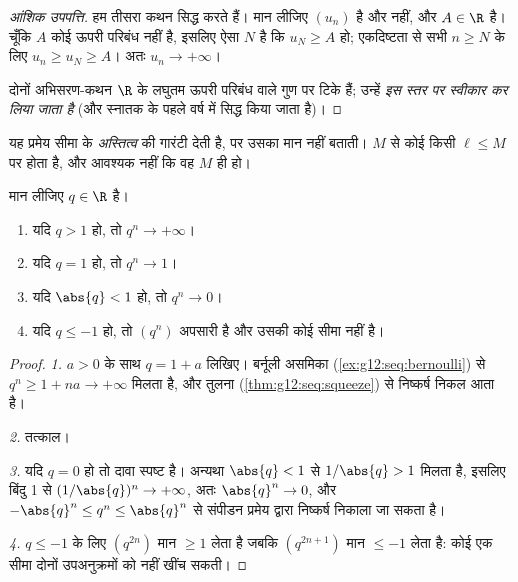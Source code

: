 \begin{proof}[आंशिक उपपत्ति]
हम तीसरा कथन सिद्ध करते हैं। मान लीजिए $(u_n)$  है और  नहीं,
और $A \in \R$ है। चूँकि $A$ कोई ऊपरी परिबंध नहीं है, इसलिए ऐसा $N$ है कि
$u_N \geq A$ हो; एकदिष्टता से सभी $n \geq N$ के लिए $u_n \geq u_N \geq A$। अतः $u_n \to +\infty$।

दोनों अभिसरण-कथन $\R$ के लघुतम ऊपरी परिबंध वाले गुण पर टिके हैं; उन्हें
\emph{इस स्तर पर स्वीकार कर लिया जाता है} (और स्नातक के पहले वर्ष में सिद्ध
किया जाता है)।
\end{proof}

\begin{remark}
यह प्रमेय सीमा के \emph{अस्तित्व} की गारंटी देती है, पर उसका मान नहीं बताती।
$M$ से  कोई   किसी $\ell \leq M$ पर  होता है, और
आवश्यक नहीं कि वह $M$ ही हो।
\end{remark}

\begin{theorem}[गुणोत्तर अनुक्रमों की सीमा]\label{thm:g12:seq:geometric}
मान लीजिए $q \in \R$ है।
\begin{enumerate}
  \item यदि $q > 1$ हो, तो $q^n \to +\infty$।
  \item यदि $q = 1$ हो, तो $q^n \to 1$।
  \item यदि $\abs{q} < 1$ हो, तो $q^n \to 0$।
  \item यदि $q \leq -1$ हो, तो $(q^n)$ अपसारी है और उसकी कोई सीमा नहीं है।
\end{enumerate}
\end{theorem}

\begin{proof}
\emph{1.} $a > 0$ के साथ $q = 1 + a$ लिखिए। बर्नूली असमिका (\cref{ex:g12:seq:bernoulli}) से $q^n \geq 1 + na \to +\infty$ मिलता
है, और तुलना (\cref{thm:g12:seq:squeeze}) से निष्कर्ष निकल आता है।

\emph{2.} तत्काल।

\emph{3.} यदि $q = 0$ हो तो दावा स्पष्ट है। अन्यथा $\abs{q} < 1$ से $1/\abs{q} > 1$ मिलता है,
इसलिए बिंदु 1 से $(1/\abs{q})^n \to +\infty$, अतः $\abs{q}^n \to 0$, और $-\abs{q}^n \leq q^n \leq \abs{q}^n$ से संपीडन प्रमेय द्वारा निष्कर्ष
निकाला जा सकता है।

\emph{4.} $q \leq -1$ के लिए $(q^{2n})$ मान $\geq 1$ लेता है जबकि $(q^{2n+1})$ मान $\leq -1$ लेता है:
कोई एक सीमा दोनों उपअनुक्रमों को नहीं खींच सकती।
\end{proof}

